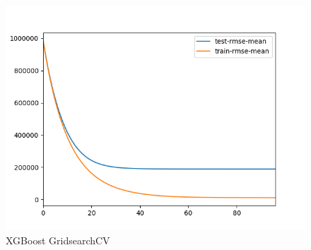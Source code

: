 \begin{figure}[h]
  \centering
  \includegraphics[width=\linewidth]{images/anhang/xgboost.png}
  \caption{XGBoost GridsearchCV}
\end{figure}
